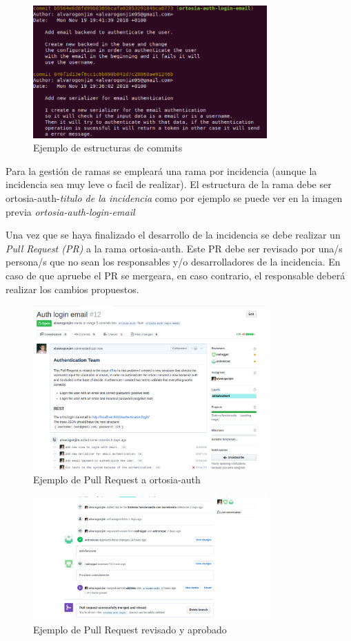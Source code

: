 \documentclass[12pt]{article}
\begin{document}
\begin{figure}[h]
\centering
\includegraphics[width=0.8\textwidth]{commits.png}
\caption{Ejemplo de estructuras de commits}
\end{figure}

Para la gestión de ramas se empleará una rama por incidencia (aunque la incidencia sea muy leve o facil de realizar). El estructura de la rama debe ser ortosia-auth-\emph{titulo de la incidencia} como por ejemplo se puede ver en la imagen previa \emph{ortosia-auth-login-email}

Una vez que se haya finalizado el desarrollo de la incidencia se debe realizar un \emph{Pull Request (PR)} a la rama ortosia-auth. Este PR debe ser revisado por una/s persona/s que no sean los responsables y/o desarrolladores de la incidencia. En caso de que apruebe el PR se mergeara, en caso contrario, el responsable deberá realizar los cambios propuestos. 

\begin{figure}[hbt!]
\centering
\includegraphics[width=0.8\textwidth]{pr.png}
\caption{Ejemplo de Pull Request a ortosia-auth}
\end{figure}

\begin{figure}[hbt!]
\centering
\includegraphics[width=0.8\textwidth]{approved.png}
\caption{Ejemplo de Pull Request revisado y aprobado}
\end{figure}
\end{document}
